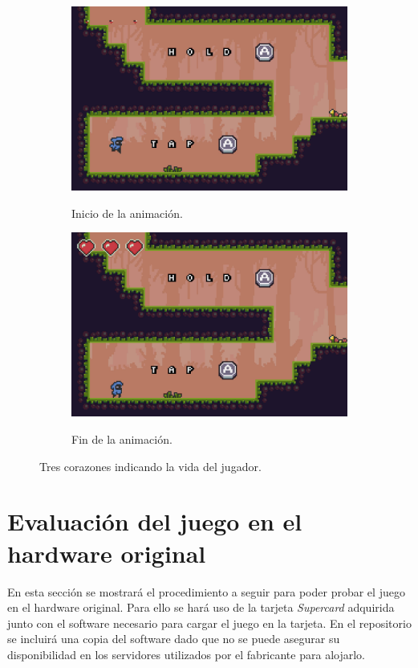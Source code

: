 \begin{figure}[h]
	\centering
	\begin{subfigure}[b]{0.45\textwidth}
		\centering
		\includegraphics[width=\textwidth]{capitulos/capitulo6/heart_small.png}
		\label{fig:heart_small}
		\caption{Inicio de la animación.}
	\end{subfigure}
	\hfill
	\begin{subfigure}[b]{0.45\textwidth}
		\centering
		\includegraphics[width=\textwidth]{capitulos/capitulo6/heart_big.png}
		\label{fig:heart_big}
		\caption{Fin de la animación.}
	\end{subfigure}
	\caption{Tres corazones indicando la vida del jugador.}
	\label{fig:heart}
\end{figure}
\FloatBarrier{}


\section{Evaluación del juego en el hardware original}
En esta sección se mostrará el procedimiento a seguir para poder probar el juego en el hardware original. Para ello se hará uso de la tarjeta \textit{Supercard} adquirida junto con el software necesario para cargar el juego en la tarjeta. En el repositorio se incluirá una copia del software dado que no se puede asegurar su disponibilidad en los servidores utilizados por el fabricante para alojarlo.


